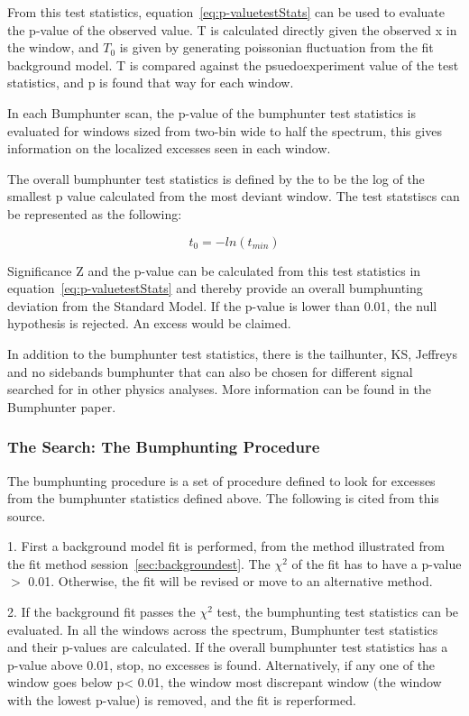    From this test statistics, equation~\ref{eq:p-valuetestStats} can be used to evaluate the p-value of the observed value. T is calculated directly given the observed x in the window, and $T_{0}$ is given by generating poissonian fluctuation from the fit background model. T is compared against the psuedoexperiment value of the test statistics, and p is found that way for each window. 

    In each Bumphunter scan, the p-value of the bumphunter test statistics is evaluated for windows sized from two-bin wide to half the spectrum, this gives information on the localized excesses seen in each window.

    The overall bumphunter test statistics is defined by the to be the log of the smallest p value calculated from the most deviant window. The test statstiscs can be represented as the following:

    \begin{equation}
        t_{0} = - ln (t_{min}) 
    \end{equation}

    Significance Z and the p-value can be calculated from this test statistics in equation~\ref{eq:p-valuetestStats} and thereby provide an overall bumphunting deviation from the Standard Model. If the p-value is lower than 0.01, the null hypothesis is rejected. An excess would be claimed. 

    In addition to the bumphunter test statistics, there is the tailhunter, KS, Jeffreys and no sidebands bumphunter that can also be chosen for different signal searched for in other physics analyses. More information can be found in the Bumphunter paper\cite{choudalakis2011hypothesis}.

    \subsubsection{The Search: The Bumphunting Procedure}
    The bumphunting procedure is a set of procedure defined to look for excesses from the bumphunter statistics defined above. The following is cited from this source\cite{Pachal:206032}.

    1.  First a background model fit is performed, from the method illustrated from the fit method session~\ref{sec:backgroundest}. The $\chi^{2}$ of the fit has to have a p-value $>$ 0.01. Otherwise, the fit will be revised or move to an alternative method.

    2.  If the background fit passes the $\chi^{2}$ test, the bumphunting test statistics can be evaluated. In all the windows across the spectrum, Bumphunter test statistics and their p-values are calculated. If the overall bumphunter test statistics has a p-value above 0.01, stop, no excesses is found. Alternatively, if any one of the window goes below p< 0.01, the window most discrepant window (the window with the lowest p-value) is removed, and the fit is reperformed.

